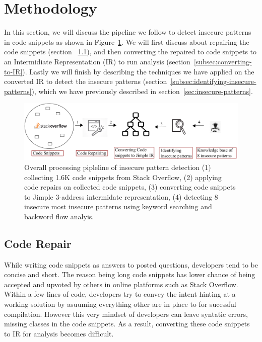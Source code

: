 \section{Methodology}
\label{sec:methodology}
In this section, we will discuss the pipeline we follow to detect insecure patterns in code snippets as shown in Figure~\ref{fig:pipeline}. 
We will first discuss about repairing the code snippets (section ~\ref{subsec:code-repair}), and then converting the repaired to code snippets to an Intermidiate Representation (IR) to run analysis (section~\ref{subsec:converting-to-IR}). 
Lastly we will finish by describing the techniques we have applied on the converted IR to detect the insecure patterns (section~\ref{subsec:identifying-insecure-patterns}), which we have previously described in section~\ref{sec:insecure-patterns}.     
\begin{figure}[t]
  \centering
  \includegraphics*[width=0.8\linewidth]{Figures/overall-process.png}
  \caption{Overall processing pipleline of insecure pattern detection (1) collecting 1.6K code snippets from Stack Overflow, 
  (2) applying code repairs on collected code snippets, (3) converting code snippets to Jimple 3-address intermidate representation,
  (4) detecting 8 insecure most insecure patterns using keyword searching and backword flow analyis.}
  \label{fig:pipeline}
\end{figure}


\subsection{Code Repair}
\label{subsec:code-repair}
While writing code snippets as answers to posted questions, developers tend to be concise and short. The reason being long code snippets 
has lower chance of being accepted and upvoted by others in online platforms such as Stack Overflow.
Within a few lines of code, developers try to convey the 
intent hinting at a working solution by asuuming everything other are in place to for sucessful compilation. 
However this very mindset of developers can leave syntatic errors, missing classes in the code snippets. 
As a result, converting these code snippets to IR for analysis becomes difficult.

